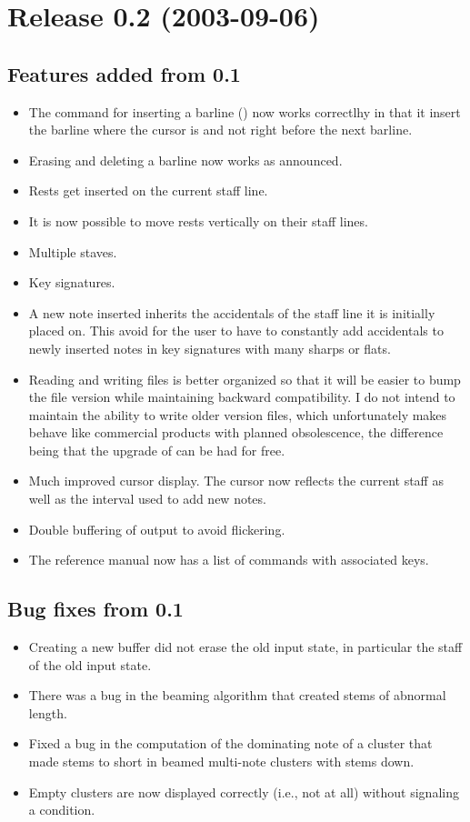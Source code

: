 \section{Release 0.2 (2003-09-06)}

\subsection{Features added from 0.1}

\begin{itemize}
\item The command for inserting a barline (\kbd{|}) now works
  correctlhy in that it insert the barline where the cursor is and
  not right before the next barline.
\item Erasing and deleting a barline now works as announced.
\item Rests get inserted on the current staff line. 
\item It is now possible to move rests vertically on their staff
  lines. 
\item Multiple staves.
\item Key signatures.
\item A new note inserted inherits the accidentals of the staff line
  it is initially placed on.  This avoid for the user to have to
  constantly add accidentals to newly inserted notes in key signatures
  with many sharps or flats.
\item Reading and writing {\gs} files is better organized so that it
  will be easier to bump the file version while maintaining backward
  compatibility.  I do not intend to maintain the ability to write
  older version files, which unfortunately makes {\gs} behave like
  commercial products with planned obsolescence, the difference being
  that the upgrade of {\gs} can be had for free.
\item Much improved cursor display.  The cursor now reflects the
  current staff as well as the interval used to add new notes.
\item Double buffering of output to avoid flickering.
\item The reference manual now has a list of commands with associated
  keys. 
\end{itemize}

\subsection{Bug fixes from 0.1}
\begin{itemize}
\item Creating a new buffer did not erase the old input state, in
  particular the staff of the old input state. 
\item There was a bug in the beaming algorithm that created stems of
  abnormal length. 
\item Fixed a bug in the computation of the dominating note of a
  cluster that made stems to short in beamed multi-note clusters with
  stems down.
\item Empty clusters are now displayed correctly (i.e., not at all)
  without signaling a condition. 
\end{itemize}

